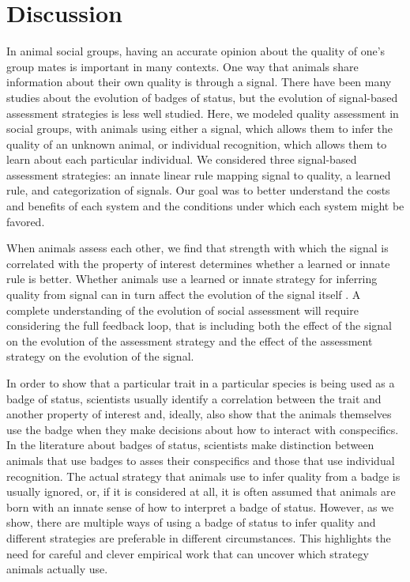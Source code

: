 \section*{Discussion}
In animal social groups, having an accurate opinion about the quality of one's group mates is important in many contexts. One way that animals share information about their own quality is through a signal. There have been many studies about the evolution of badges of status, but the evolution of signal-based assessment strategies is less well studied. Here, we modeled quality assessment in social groups, with animals using either a signal, which allows them to infer the quality of an unknown animal, or individual recognition, which allows them to learn about each particular individual. We considered three signal-based assessment strategies: an innate linear rule mapping signal to quality, a learned rule, and categorization of signals. Our goal was to better understand the costs and benefits of each system and the conditions under which each system might be favored. 

When animals assess each other, we find that strength with which the signal is correlated with the property of interest determines whether a learned or innate rule is better. Whether animals use a learned or innate strategy for inferring quality from signal can in turn affect the evolution of the signal itself \citep{Kamo:2002vi}. A complete understanding of the evolution of social assessment will require considering the full feedback loop, that is including both the effect of the signal on the evolution of the assessment strategy and the effect of the assessment strategy on the evolution of the signal.

In order to show that a particular trait in a particular species is being used as a badge of status, scientists usually identify a correlation between the trait and another property of interest and, ideally, also show that the animals themselves use the badge when they make decisions about how to interact with conspecifics. In the literature about badges of status, scientists make distinction between animals that use badges to asses their conspecifics and those that use individual recognition. The actual strategy that animals use to infer quality from a badge is usually ignored, or, if it is considered at all, it is often assumed that animals are born with an innate sense of how to interpret a badge of status. However, as we show, there are multiple ways of using a badge of status to infer quality and different strategies are preferable in different circumstances. This highlights the need for careful and clever empirical work that can uncover which strategy animals actually use. %

